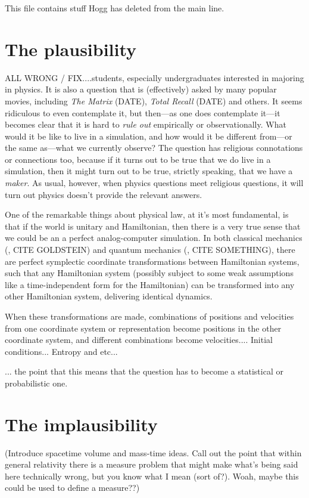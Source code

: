 This file contains stuff Hogg has deleted from the main line.

\section{The plausibility}

ALL WRONG / FIX....students, especially undergraduates interested in majoring in physics.
It is also a question that is (effectively) asked by many popular
movies, including \textit{The Matrix} (DATE), \textit{Total Recall}
(DATE) and others.
It seems ridiculous to even contemplate it, but then---as one does
contemplate it---it becomes clear that it is hard to \emph{rule out}
empirically or observationally.
What would it be like to live in a simulation, and how would it be
different from---or the same as---what we currently observe?
The question has religious connotations or connections too, because if
it turns out to be true that we do live in a simulation, then it might
turn out to be true, strictly speaking, that we have a \emph{maker}.
As usual, however, when physics questions meet religious questions, it
will turn out
physics doesn't provide the relevant answers.

One of the remarkable things about physical law, at it's most fundamental,
is that if the world is unitary and Hamiltonian, then there is a very
true sense that we could be an a perfect analog-computer simulation.
In both classical mechanics (\eg, CITE GOLDSTEIN) and quantum mechanics
(\eg, CITE SOMETHING), there are perfect symplectic coordinate transformations
between Hamiltonian systems, such that any Hamiltonian system (possibly subject
to some weak assumptions like a time-independent form for the Hamiltonian)
can be transformed into any other Hamiltonian system, delivering identical
dynamics.

When these transformations are made, combinations of positions and
velocities from one coordinate system or representation become
positions in the other coordinate system, and different combinations
become velocities....
Initial conditions...
Entropy and etc...

... the point that this means that the question has to become a
statistical or probabilistic one.

\section{The implausibility}

(Introduce spacetime volume and mass-time ideas. Call out the point
that within general relativity there is a measure problem that might
make what's being said here technically wrong, but you know what I
mean (sort of?). Woah, maybe this could be used to define a measure??)

